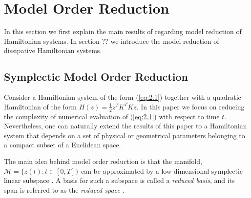 \section{Model Order Reduction}
In this section we first explain the main results of \cite{Peng:2014di} regarding model reduction of Hamiltonian systems. In section ?? we introduce the model reduction of dissipative Hamiltonian systems.

\subsection{Symplectic Model Order Reduction}
Consider a Hamiltonian system of the form (\ref{eq:2.1}) together with a quadratic Hamiltonian of the form $H(z) = \frac 1 2 z^T K^T K z$. In this paper we focus on reducing the complexity of numerical evaluation of (\ref{eq:2.1}) with respect to time $t$. Nevertheless, one can naturally extend the results of this paper to a Hamiltonian system that depends on a set of physical or geometrical parameters belonging to a compact subset of a Euclidean space.

The main idea behind model order reduction is that the manifold, $\mathcal M = \{ z(t) : t \in [0,T] \}$ can be approximated by a low dimensional symplectic linear subspace \cite{hesthaven2015certified,quarteroni2015reduced}. A basis for such a subspace is called a \emph{reduced basis}, and its span is referred to as the \emph{reduced space} \cite{hesthaven2015certified}.

